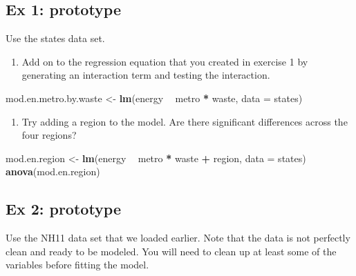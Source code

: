 \documentclass[]{book}
\newenvironment{Shaded}{\begin{snugshade}}{\end{snugshade}}
\newcommand{\KeywordTok}[1]{\textcolor[rgb]{0.13,0.29,0.53}{\textbf{#1}}}
\newcommand{\DataTypeTok}[1]{\textcolor[rgb]{0.13,0.29,0.53}{#1}}
\newcommand{\StringTok}[1]{\textcolor[rgb]{0.31,0.60,0.02}{#1}}
\newcommand{\OperatorTok}[1]{\textcolor[rgb]{0.81,0.36,0.00}{\textbf{#1}}}
\newcommand{\NormalTok}[1]{#1}
\providecommand{\tightlist}{%
  \setlength{\itemsep}{0pt}\setlength{\parskip}{0pt}}
\begin{document}
\subsection{Ex 1: prototype}\label{ex-1-prototype-1}

Use the states data set.

\begin{enumerate}
\def\labelenumi{\arabic{enumi}.}
\tightlist
\item
  Add on to the regression equation that you created in exercise 1 by
  generating an interaction term and testing the interaction.
\end{enumerate}

\begin{Shaded}
\begin{Highlighting}[]
\NormalTok{  mod.en.metro.by.waste <-}\StringTok{ }\KeywordTok{lm}\NormalTok{(energy }\OperatorTok{~}\StringTok{ }\NormalTok{metro }\OperatorTok{*}\StringTok{ }\NormalTok{waste, }\DataTypeTok{data =}\NormalTok{ states)}
\end{Highlighting}
\end{Shaded}

\begin{enumerate}
\def\labelenumi{\arabic{enumi}.}
\setcounter{enumi}{1}
\tightlist
\item
  Try adding a region to the model. Are there significant differences
  across the four regions?
\end{enumerate}

\begin{Shaded}
\begin{Highlighting}[]
\NormalTok{  mod.en.region <-}\StringTok{ }\KeywordTok{lm}\NormalTok{(energy }\OperatorTok{~}\StringTok{ }\NormalTok{metro }\OperatorTok{*}\StringTok{ }\NormalTok{waste }\OperatorTok{+}\StringTok{ }\NormalTok{region, }\DataTypeTok{data =}\NormalTok{ states)}
  \KeywordTok{anova}\NormalTok{(mod.en.region)}
\end{Highlighting}
\end{Shaded}

\subsection{Ex 2: prototype}\label{ex-2-prototype-1}

Use the NH11 data set that we loaded earlier. Note that the data is not
perfectly clean and ready to be modeled. You will need to clean up at
least some of the variables before fitting the model.
\end{document}
